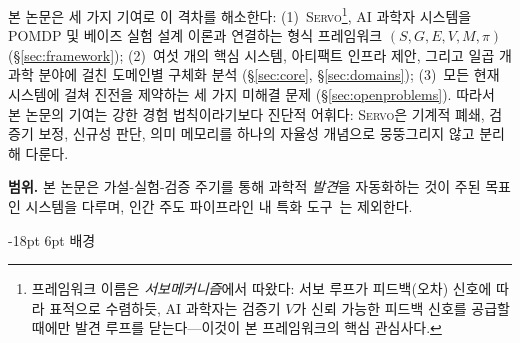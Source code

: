 \documentclass[11pt]{article}
\makeatletter
\renewcommand\section{\@startsection{section}{1}{\z@}%
  {-18pt \@plus -4pt \@minus -2pt}%
  {6pt \@plus 2pt}%
  {\normalfont\large\bfseries}}
\newcommand{\sgmvpi}{$(S, G, E, V, M, \pi)$}
\newcommand{\framework}{\textsc{Servo}}
\makeatother
\begin{document}
본 논문은 세 가지 기여로 이 격차를 해소한다: (1)~\framework{}\footnote{프레임워크 이름은 \emph{서보메커니즘}에서 따왔다: 서보 루프가 피드백(오차) 신호에 따라 표적으로 수렴하듯, AI 과학자는 검증기 $V$가 신뢰 가능한 피드백 신호를 공급할 때에만 발견 루프를 닫는다---이것이 본 프레임워크의 핵심 관심사다.}, AI 과학자 시스템을 POMDP 및 베이즈 실험 설계 이론과 연결하는 형식 프레임워크 \sgmvpi{} (§\ref{sec:framework}); (2)~여섯 개의 핵심 시스템, 아티팩트 인프라 제안, 그리고 일곱 개 과학 분야에 걸친 도메인별 구체화 분석 (§\ref{sec:core}, §\ref{sec:domains}); (3)~모든 현재 시스템에 걸쳐 진전을 제약하는 세 가지 미해결 문제 (§\ref{sec:openproblems}). 따라서 본 논문의 기여는 강한 경험 법칙이라기보다 진단적 어휘다: \framework{}은 기계적 폐쇄, 검증기 보정, 신규성 판단, 의미 메모리를 하나의 자율성 개념으로 뭉뚱그리지 않고 분리해 다룬다.

\noindent\textbf{범위.} 본 논문은 가설-실험-검증 주기를 통해 과학적 \emph{발견}을 자동화하는 것이 주된 목표인 시스템을 다루며, 인간 주도 파이프라인 내 특화 도구~\citep{jumper2021alphafold}는 제외한다.

\section{배경}
\label{sec:background}
\end{document}
